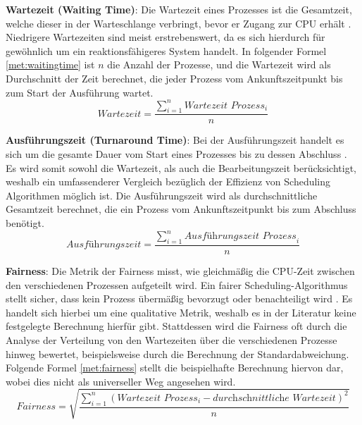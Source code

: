 \textbf{Wartezeit (Waiting Time)}: Die Wartezeit eines Prozesses ist die Gesamtzeit, welche dieser in der Warteschlange verbringt, bevor er Zugang zur \ac{CPU} erhält  \autocite{pemasinghe_comparison_2022}. Niedrigere Wartezeiten sind meist erstrebenswert, da es sich hierdurch für gewöhnlich um ein reaktionsfähigeres System handelt. In folgender Formel \ref{met:waitingtime} ist \( n \) die Anzahl der Prozesse, und die Wartezeit wird als Durchschnitt der Zeit berechnet, die jeder Prozess vom Ankunftszeitpunkt bis zum Start der Ausführung wartet.
\begin{equation}
\textit{Wartezeit} = \frac{\sum_{i=1}^{n} \textit{Wartezeit Prozess}_{i}}{n}
\label{met:waitingtime}
\end{equation}


\textbf{Ausführungszeit (Turnaround Time)}: Bei der Ausführungszeit handelt es sich um die gesamte Dauer vom Start eines Prozesses bis zu dessen Abschluss \autocite{pemasinghe_comparison_2022}. Es wird somit sowohl die Wartezeit, als auch die Bearbeitungszeit berücksichtigt, weshalb ein umfassenderer Vergleich bezüglich der Effizienz von Scheduling Algorithmen möglich ist. Die Ausführungszeit wird als durchschnittliche Gesamtzeit berechnet, die ein Prozess vom Ankunftszeitpunkt bis zum Abschluss benötigt.
\begin{equation}
	\textit{Ausführungszeit} = \frac{\sum_{i=1}^{n} \textit{Ausführungszeit Prozess}_{i}}{n}
	\label{met:turnaroundtime}
\end{equation}


\textbf{Fairness}: Die Metrik der Fairness misst, wie gleichmäßig die \ac{CPU}-Zeit zwischen den verschiedenen Prozessen aufgeteilt wird. Ein fairer Scheduling-Algorithmus stellt sicher, dass kein Prozess übermäßig bevorzugt oder benachteiligt wird \autocite{haldar_fairness_1991}. Es handelt sich hierbei um eine qualitative Metrik, weshalb es in der Literatur keine festgelegte Berechnung hierfür gibt. Stattdessen wird die Fairness oft durch die Analyse der Verteilung von den Wartezeiten über die verschiedenen Prozesse hinweg bewertet, beispielsweise durch die Berechnung der Standardabweichung. Folgende Formel \ref{met:fairness} stellt die beispielhafte Berechnung hiervon dar, wobei dies nicht als universeller Weg angesehen wird. 
\begin{equation}
	\textit{Fairness} = \sqrt{\frac{\sum_{i=1}^{n} (\textit{Wartezeit Prozess}_{i} - \textit{durchschnittliche Wartezeit})^2}{n}}
	\label{met:fairness}
\end{equation}
